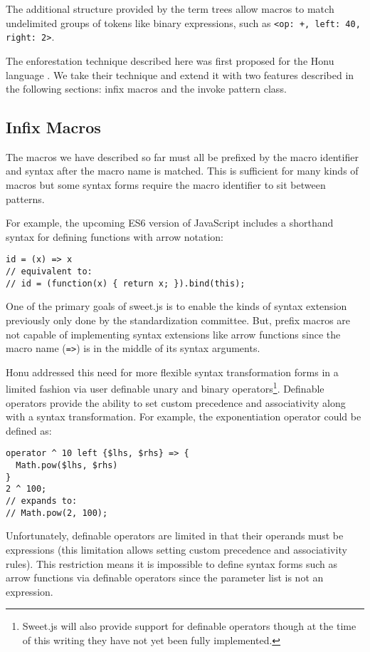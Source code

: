 \documentclass[preprint,10pt]{sigplanconf}
\begin{document}
The additional structure provided by the term trees allow macros to
match undelimited groups of tokens like binary expressions, such as
\verb!<op: +, left: 40, right: 2>!.

The enforestation technique described here was first proposed for the
Honu language \cite{Rafkind2013}. We take their technique and extend
it with two features described in the following sections:
infix macros and the invoke pattern class.

\subsection{Infix Macros}
\label{sec:infix}
The macros we have described so far must all be prefixed by the macro
identifier and syntax after the macro name is matched. This is
sufficient for many kinds of macros but some syntax forms require the
macro identifier to sit between patterns.

For example, the upcoming ES6 version of JavaScript includes a
shorthand syntax for defining functions with arrow notation:

\begin{lstlisting}
id = (x) => x
// equivalent to:
// id = (function(x) { return x; }).bind(this);
\end{lstlisting}

One of the primary goals of sweet.js is to enable the kinds of syntax
extension previously only done by the standardization committee. But,
prefix macros are not capable of implementing syntax extensions like
arrow functions since the macro name (\verb!=>!) is in the middle
of its syntax arguments.

Honu addressed this need for more flexible syntax transformation forms
in a limited fashion via user definable unary and binary
operators\footnote{Sweet.js will also provide support for definable
  operators though at the time of this writing they have not yet been
  fully implemented.}. Definable operators provide the ability to set
custom precedence and associativity along with a syntax
transformation. For example, the exponentiation operator could be
defined as:
\begin{lstlisting}
operator ^ 10 left {$lhs, $rhs} => {
  Math.pow($lhs, $rhs)
}
2 ^ 100;
// expands to:
// Math.pow(2, 100);
\end{lstlisting}

Unfortunately, definable operators are limited in that their operands
must be expressions (this limitation allows setting custom precedence
and associativity rules). This restriction means it is impossible to
define syntax forms such as arrow functions via definable operators
since the parameter list is not an expression.
\end{document}
